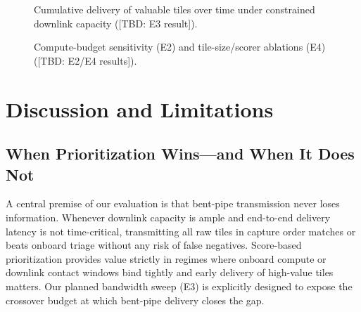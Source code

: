 \documentclass[conference]{IEEEtran}
\begin{document}
\begin{figure}[t]
\centering
{}
\caption{Cumulative delivery of valuable tiles over time under constrained downlink capacity ([TBD: E3 result]).}
\label{fig:e3}
\end{figure}

\begin{figure}[t]
\centering
{}
\caption{Compute-budget sensitivity (E2) and tile-size/scorer ablations (E4) ([TBD: E2/E4 results]).}
\label{fig:e2e4}
\end{figure}

\section{Discussion and Limitations}

\subsection{When Prioritization Wins---and When It Does Not}
A central premise of our evaluation is that bent-pipe transmission never loses information. Whenever downlink capacity is ample and end-to-end delivery latency is not time-critical, transmitting all raw tiles in capture order matches or beats onboard triage without any risk of false negatives. Score-based prioritization provides value strictly in regimes where onboard compute or downlink contact windows bind tightly and early delivery of high-value tiles matters. Our planned bandwidth sweep (E3) is explicitly designed to expose the crossover budget at which bent-pipe delivery closes the gap.
\end{document}
